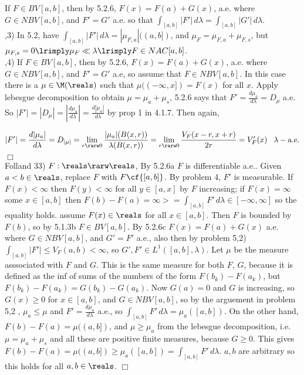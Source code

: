 \noindent
If $F \in BV[a,b]$, then by 5.2.6, $F(x) = F(a) + G(x)$, a.e. where $G \in NBV[a,b]$, and $F'=G'$ a.e. so that $\int_{[a,b]} |F'| \, d\lambda = \int_{[a,b]} |G'| \, d\lambda$. \\


,3) In 5.2, have $\int_{[a,b]} |F'| \, d\lambda = |\mu_{F,a}|((a,b])$, and $\mu_{F} = \mu_{F,a} + \mu_{F,s}$, but $\mu_{F,s} = 0 \lrimply \mu_{F} \ll \lambda \lrimply F \in NAC[a,b]$. \\

,4) If $F \in BV[a,b]$, then by 5.2.6, $F(x) = F(a) + G(x)$, a.e. where $G \in NBV[a,b]$, and $F'=G'$ a.e, so assume that $F \in NBV[a,b]$. In this case there is a $\mu \in \M(\reals)$ such that $\mu((-\infty,x]) = F(x)$ for all $x$. Apply lebesgue decomposition to obtain $\mu = \mu_a + \mu_s$, 5.2.6 says that $F' = \frac{d\mu_a}{d\lambda} = D_\mu$ a.e. So $|F'| = |D_\mu|= |\frac{d\mu_a}{d\lambda}| = \frac{d|\mu_a|}{d\lambda}$ by prop 1 in 4.1.7. Then again,


$$
|F'| = \frac{d|\mu_a|}{d\lambda} = D_{|\mu|} = \lim_{r \rarw 0} \frac{ |\mu_a|(B(x,r))}{ \lambda(B(x,r))} = \lim_{r \rarw 0} \frac{ V_F(x-r,x+r) }{2r}  = V_F'(x) \; \; \;  \lambda-\textrm{a.e.}
$$ $\Box$ \\


\noindent
Folland 33) $F: \reals \rarw \reals$, By 5.2.6a $F$ is differentiable a.e.. Given $a<b \in \reals$, replace $F$ with $F \cf{[a,b]}$. By problem 4, $F'$ is measurable. If $F(x) < \infty$ then $F(y) < \infty$ for all $y \in [a,x]$ by $F$ increasing; if $F(x) = \infty$ some $x \in [a,b]$ then $F(b) - F(a) = \infty >= \int_{[a,b]} F' \, d\lambda \in [-\infty,\infty]$ so the equality holds. assume $F(x) \in \reals$ for all $x \in [a,b]$. Then $F$ is bounded by $F(b)$, so by 5.1.3b $F \in BV[a,b]$. By 5.2.6c $F(x) = F(a) + G(x)$ a.e. where $G \in NBV[a,b]$, and $G' = F'$ a.e., also then by problem 5,2) $\int_{[a,b]} |F'| \le V_F(a,b) < \infty$, so $G',F' \in L^1([a,b],\lambda)$. Let $\mu$ be the measure asssociated with $F$ and $G$. This is the same measure for both $F$, $G$, because it is defined as the inf of sums of the numbers of the form $F(b_k)-F(a_k)$, but $F(b_k)-F(a_k) = G(b_k) - G(a_k)$. Now $G(a) = 0$ and $G$ is increasing, so $G(x) \ge 0$ for $x \in [a,b]$, and $G \in NBV[a,b]$, so by the arguement in problem 5,2 , $\mu_{a} \le \mu$ and $F' = \frac{d \mu_a}{d\lambda}$ a.e., so $\int_{[a,b]} F' \, d\lambda = \mu_a([a,b])$. On the other hand, $F(b) - F(a) = \mu((a,b])$, and $ \mu \ge \mu_a$ from the lebesgue decomposition, i.e. $\mu = \mu_a + \mu_s$ and all these are positive finite measures, because $G \ge 0$. This gives $F(b) - F(a) = \mu((a,b]) \ge \mu_a([a,b])  = \int_{[a,b]} F' \, d\lambda$. $a,b$ are arbitrary so this holds for all $a,b \in \reals$. $\Box$





